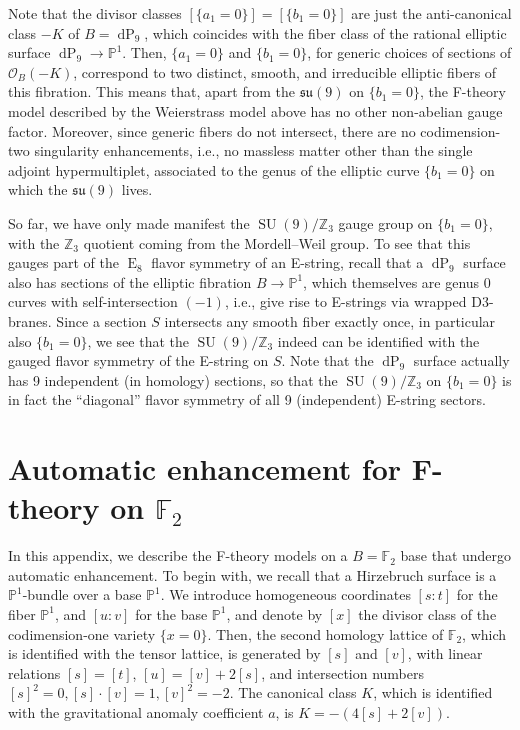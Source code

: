 \documentclass[11pt, a4paper]{article}
\newcommand*{\bbZ}{\ensuremath{\mathbb{Z}}}
\newcommand*{\bbP}{\ensuremath{\mathbb{P}}}
\newcommand*{\bbF}{\ensuremath{\mathbb{F}}}
\DeclareMathOperator{\SU}{SU}
\DeclareMathOperator{\gE}{E}
\newcommand*{\fksu}{\ensuremath{\mathfrak{su}}}
\begin{document}
Note that the divisor classes $[\{a_1 =0\}] = [\{b_1=0\}]$ are just the anti-canonical class $-K$ of $B = \operatorname{dP}_9$, which coincides with the fiber class of the rational elliptic surface $\operatorname{dP}_9 \rightarrow \bbP^1$.
Then, $\{a_1 = 0\}$ and $\{b_1 = 0\}$, for generic choices of sections of $\mathcal{O}_B(-K)$, correspond to two distinct, smooth, and irreducible elliptic fibers of this fibration.
This means that, apart from the $\fksu(9)$ on $\{b_1=0\}$, the F-theory model described by the Weierstrass model above has no other non-abelian gauge factor.
Moreover, since generic fibers do not intersect, there are no codimension-two singularity enhancements, i.e., no massless matter other than the single adjoint hypermultiplet, associated to the genus of the elliptic curve $\{b_1=0\}$ on which the $\fksu(9)$ lives.


So far, we have only made manifest the $\SU(9)/\bbZ_3$ gauge group on $\{b_1=0\}$, with the $\bbZ_3$ quotient coming from the Mordell--Weil group.
To see that this gauges part of the $\gE_8$ flavor symmetry of an E-string, recall that a $\operatorname{dP}_9$ surface also has sections of the elliptic fibration $B \rightarrow \bbP^1$, which themselves are genus 0 curves with self-intersection $(-1)$, i.e., give rise to E-strings via wrapped D3-branes.
Since a section $S$ intersects any smooth fiber exactly once, in particular also $\{b_1=0\}$, we see that the $\SU(9) / \bbZ_3$ indeed can be identified with the gauged flavor symmetry of the E-string on $S$.
Note that the $\operatorname{dP}_9$ surface actually has 9 independent (in homology) sections, so that the $\SU(9)/\bbZ_3$ on $\{b_1=0\}$ is in fact the ``diagonal'' flavor symmetry of all 9 (independent) E-string sectors.





\section{Automatic enhancement for F-theory on \texorpdfstring{$\bbF_2$}{F2}}
\label{app:F-theory_on_F2}

In this appendix, we describe the F-theory models on a $B = \bbF_2$ base that undergo automatic enhancement.
To begin with, we recall that a Hirzebruch surface is a $\bbP^1$-bundle over a base $\bbP^1$.
We introduce homogeneous coordinates $[s:t]$ for the fiber $\bbP^1$, and $[u:v]$ for the base $\bbP^1$, and denote by $[x]$ the divisor class of the codimension-one variety $\{x=0\}$.
Then, the second homology lattice of $\bbF_2$, which is identified with the tensor lattice, is generated by $[s]$ and $[v]$, with linear relations $[s] = [t]$, $[u] = [v] + 2[s]$, and intersection numbers $[s]^2 = 0, [s] \cdot [v] = 1, [v]^2 = -2$.
The canonical class $K$, which is identified with the gravitational anomaly coefficient $a$, is $K = - (4[s] + 2[v])$.
\end{document}
